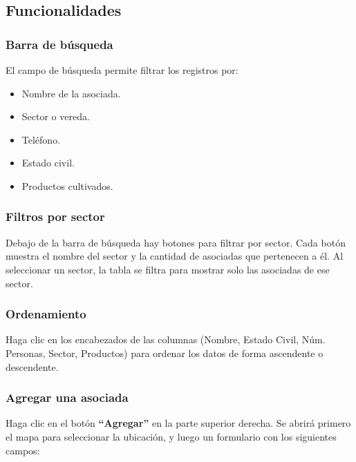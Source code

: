 \documentclass[12pt]{article}
\begin{document}
\subsection{Funcionalidades}

\subsubsection{Barra de búsqueda}
El campo de búsqueda permite filtrar los registros por:
\begin{itemize}[nosep]
  \item Nombre de la asociada.
  \item Sector o vereda.
  \item Teléfono.
  \item Estado civil.
  \item Productos cultivados.
\end{itemize}

\subsubsection{Filtros por sector}
Debajo de la barra de búsqueda hay botones para filtrar por sector. Cada botón muestra el nombre del sector y la cantidad de asociadas que pertenecen a él. Al seleccionar un sector, la tabla se filtra para mostrar solo las asociadas de ese sector.

\subsubsection{Ordenamiento}
Haga clic en los encabezados de las columnas (Nombre, Estado Civil, Núm. Personas, Sector, Productos) para ordenar los datos de forma ascendente o descendente.

\subsubsection{Agregar una asociada}
Haga clic en el botón \textbf{``Agregar''} en la parte superior derecha. Se abrirá primero el mapa para seleccionar la ubicación, y luego un formulario con los siguientes campos:
\end{document}
